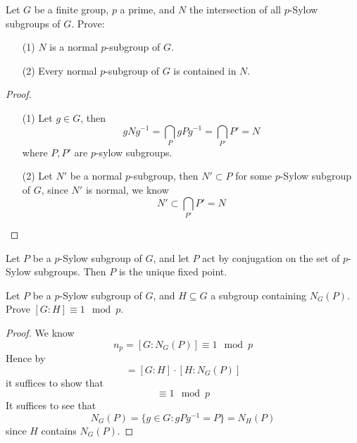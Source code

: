 \documentclass[openany]{book}
\begin{document}
\begin{prob}[2.8]
Let \( G \) be a finite group, \( p \) a prime, and \( N \) the intersection of all \( p \)-Sylow subgroups of \( G \). Prove:
\begin{itemize}
    \item[(1)] \( N \) is a normal \( p \)-subgroup of \( G \).
    \item[(2)] Every normal \( p \)-subgroup of \( G \) is contained in \( N \).
\end{itemize}
\end{prob}
\begin{proof}
    \begin{itemize}
        \item[(1)] Let $g\in G$, then 
        \begin{equation*}
            gNg^{-1}=\bigcap_{P}gPg^{-1}=\bigcap_{P'}P'=N
        \end{equation*}
        where $P,P'$ are $p$-sylow subgroups.
        \item[(2)] Let $N'$ be a normal $p$-subgroup, then $N'\subset P$ for some $p$-Sylow subgroup of $G$, since $N'$ is normal, we know
        \begin{equation*}
            N'\subset\bigcap_{P'}P'=N
        \end{equation*}
    \end{itemize}
\end{proof}

\begin{prop}
Let \( P \) be a \( p \)-Sylow subgroup of \( G \), and let \( P \) act by conjugation on the set of \( p \)-Sylow subgroups. Then \( P \) is the unique fixed point. 
\end{prop}



\begin{prob}[2.12]
Let \( P \) be a \( p \)-Sylow subgroup of \( G \), and \( H \subseteq G \) a subgroup containing \( N_G(P) \). Prove \( [G : H] \equiv 1 \mod p \).
\end{prob}
\begin{proof}
    We know
    \begin{equation*}
        n_p=[G:N_G(P)]\equiv 1\mod p
    \end{equation*}
    Hence by
    \begin{equation*}
        [G:N_G(P)]=[G:H]\cdot[H:N_G(P)]
    \end{equation*}
    it suffices to show that 
    \begin{equation*}
        [H:N_G(P)]\equiv 1\mod p
    \end{equation*}
    It suffices to see that 
    \begin{equation*}
        N_G(P)=\{g\in G: gPg^{-1}=P\}=N_H(P)
    \end{equation*}
    since $H$ contains $N_G(P)$.
\end{proof}
\end{document}
